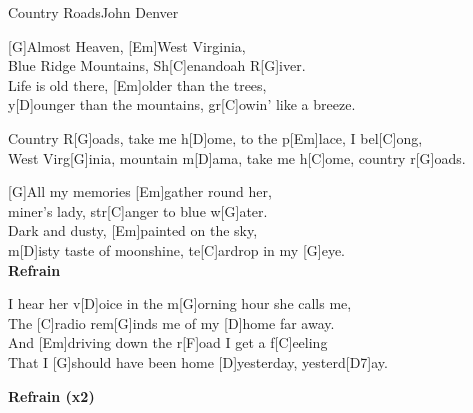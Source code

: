 \begin{song}{Country Roads}{John Denver}
    \begin{guitarMagic}

        [G]Almost Heaven, [Em]West Virginia, \\
        [D]Blue Ridge Mountains, Sh[C]enandoah R[G]iver. \\
        [G]Life is old there, [Em]older than the trees, \\
        y[D]ounger than the mountains, gr[C]owin' like a breeze.

        \begin{chorus}
            Country R[G]oads, take me h[D]ome, 
            to the p[Em]lace, I bel[C]ong, \\
            West Virg[G]inia, mountain m[D]ama, 
            take me h[C]ome, country r[G]oads.
        \end{chorus}

        [G]All my memories [Em]gather round her, \\
        [D]miner's lady, str[C]anger to blue w[G]ater. \\
        [G]Dark and dusty, [Em]painted on the sky, \\
        m[D]isty taste of moonshine, te[C]ardrop in my [G]eye. \\

        \textbf{Refrain}

        \begin{bridge}
            [Em]I hear her v[D]oice in the m[G]orning hour she calls me, \\
            The [C]radio rem[G]inds me of my [D]home far away. \\
            And [Em]driving down the r[F]oad I get a f[C]eeling \\
            That I [G]should have been home [D]yesterday, yesterd[D7]ay.
        \end{bridge}

        \textbf{Refrain (x2)}

    \end{guitarMagic}
\end{song}
